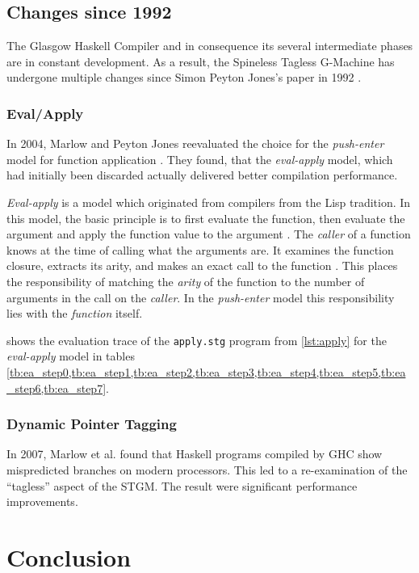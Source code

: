 \documentclass[runningheads]{llncs}
\begin{document}
\subsection{Changes since 1992}
The Glasgow Haskell Compiler and in consequence its several intermediate phases are in constant development. As a result, the Spineless Tagless G-Machine has undergone multiple changes since Simon Peyton Jones's paper in 1992 \cite{jones1992implementing}. 

\subsubsection{Eval/Apply}
In 2004, Marlow and Peyton Jones\cite{marlow2004making} reevaluated the choice for the \textit{push-enter} model for function application . They found, that the \textit{eval-apply} model, which had initially been discarded \cite{jones1992implementing} actually delivered better compilation performance.

\textit{Eval-apply} is a model which originated from compilers from the Lisp tradition. In this model, the basic principle is to first evaluate the function, then evaluate the argument and apply the function value to the argument \cite{jones1992implementing}. The \textit{caller} of a function knows at the time of calling what the arguments are. It examines the function closure, extracts its arity, and makes an exact call to the function \cite{marlow2004making}. This places the responsibility of matching the \textit{arity} of the function to the number of arguments in the call on the \textit{caller}. In the \textit{push-enter} model this responsibility lies with the \textit{function} itself.

 shows the evaluation trace of the \texttt{apply.stg} program  from \cref{lst:apply} for the \textit{eval-apply} model in tables \cref{tb:ea_step0,tb:ea_step1,tb:ea_step2,tb:ea_step3,tb:ea_step4,tb:ea_step5,tb:ea_step6,tb:ea_step7}.


\subsubsection{Dynamic Pointer Tagging}
In 2007, Marlow et al. \cite{marlow2007faster} found that Haskell programs compiled by GHC show mispredicted branches on modern processors. This led to a re-examination of the \enquote{tagless} aspect of the STGM. The result were significant performance improvements.


\section{Conclusion}
\label{sec:conclusion}
\end{document}
